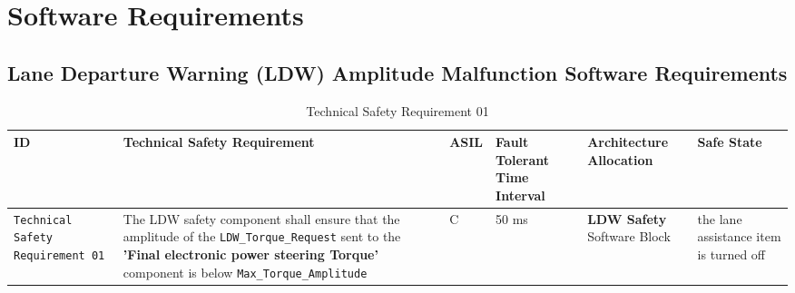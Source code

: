 \chapter{Software Requirements}
\label{ch:requirements}

\section{Lane Departure Warning (LDW) Amplitude Malfunction Software Requirements}

 
 
 
 


\begin{table}[!htpb]
\caption{Technical Safety Requirement 01}
\begin{center}
\scriptsize
\renewcommand{\arraystretch}{1.4}
\begin{tabular}{ L{1.8cm}|L{5.2cm}|L{0.7cm}|L{1.3cm}|L{1.8cm}|L{2.0cm}  }
\hline
{}
ID &
Technical Safety Requirement  &
ASIL &
Fault Tolerant Time Interval  &  
Architecture Allocation  &  
Safe State \\\hline
\textcolor{harmonia-blue}{\texttt{Technical Safety Requirement 01}}  &
The LDW safety component shall ensure that the amplitude of the 
  \textcolor{dark-red}{\texttt{LDW\_Torque\_Request}}
  sent to the 
  \textbf{'Final electronic power steering Torque'} component is below 
  \textcolor{dark-red}{\texttt{Max\_Torque\_Amplitude}} &
C &
50 ms  &
  \textbf{LDW Safety} Software Block  &
the lane assistance item is turned off 
\\\hline
\end{tabular}
\end{center}
\label{tab:tr01}
\end{table}



